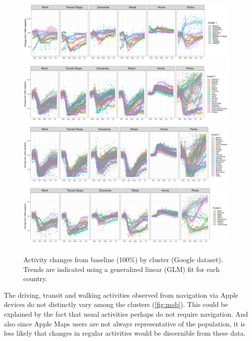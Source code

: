 \documentclass[titlepage,oneside,12pt]{article}
\newcommand{\?}{\stackrel{?}{=}}
\begin{document}
\begin{figure}[h!]
  \centering
  \includegraphics[width=\textwidth]{c1-activity}
  \includegraphics[width=\textwidth]{c2-activity}
  \includegraphics[width=\textwidth]{c3-activity}
  \includegraphics[width=\textwidth]{c4-activity}
  \caption{Activity changes from baseline (100\%) by cluster (Google dataset).  Trends are indicated using a generalized linear (GLM) fit for each country.}
  \label{fig:act}
\end{figure}


The driving, transit and walking activities observed from navigation via Apple devices do not distinctly vary among the clusters (\autoref{fig:mob}).
This could be explained by the fact that usual activities perhaps do not require navigation.
And also since Apple Maps users are not always representative of the population, it is less likely that changes in regular activities would be discernible from these data.
\end{document}
